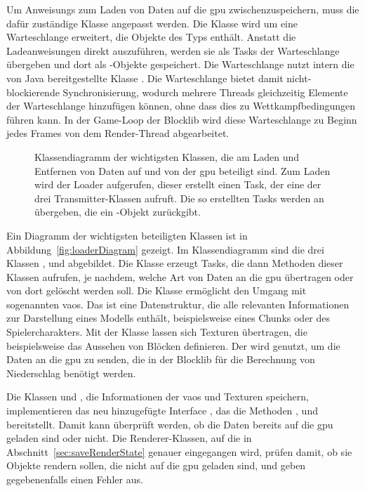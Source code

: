 Um \glspl{Anweisung} zum Laden von Daten auf die \ac{gpu} zwischenzuspeichern, muss die dafür zuständige Klasse \classLoader{} angepasst werden. Die Klasse wird um eine Warteschlange erweitert, die Objekte des Typs \classRunnable{} enthält. Anstatt die Ladeanweisungen direkt auszuführen, werden sie als Tasks der Warteschlange übergeben und dort als \classRunnable{}-Objekte gespeichert. Die Warteschlange nutzt intern die von Java bereitgestellte Klasse \classConcurrentLinkedQueue{}. Die Warteschlange bietet damit nicht-blockierende Synchronisierung, wodurch mehrere Threads gleichzeitig Elemente der Warteschlange hinzufügen können, ohne dass dies zu Wettkampfbedingungen führen kann. In der Game-Loop der Blocklib wird diese Warteschlange zu Beginn jedes Frames von dem Render-Thread abgearbeitet.

\begin{figure}
	\centering
	
	\caption[Klassendiagramm der wichtigsten Klassen, die am Laden und Entfernen von Daten auf und von der  beteiligt sind.]{Klassendiagramm der wichtigsten Klassen, die am Laden und Entfernen von Daten auf und von der \ac{gpu} beteiligt sind. Zum Laden wird der Loader aufgerufen, dieser erstellt einen Task, der eine der drei Transmitter-Klassen aufruft. Die so erstellten Tasks werden an \classDoubleBufferedAsyncQueue{} übergeben, die ein \classCompletableFuture{}-Objekt zurückgibt.}\label{fig:loaderDiagram}
\end{figure}
Ein Diagramm der wichtigsten beteiligten Klassen ist in Abbildung~\vref{fig:loaderDiagram} gezeigt. Im Klassendiagramm sind die drei Klassen \classVAOTransmitter{}, \classTextureTransmitter{} und \classDataTransmitter{} abgebildet. Die Klasse \classLoader{} erzeugt Tasks, die dann Methoden dieser Klassen aufrufen, je nachdem, welche Art von Daten an die \ac{gpu} übertragen oder von dort gelöscht werden soll. Die Klasse \classVAOTransmitter{} ermöglicht den Umgang mit sogenannten \acp{vao}. Das ist eine Datenstruktur, die alle relevanten Informationen zur Darstellung eines Modells enthält, beispielsweise eines Chunks oder des Spielercharakters. Mit der Klasse \classTextureTransmitter{} lassen sich Texturen übertragen, die beispielsweise das Aussehen von Blöcken definieren. Der \classDataTransmitter{} wird genutzt, um die Daten an die \ac{gpu} zu senden, die in der Blocklib für die Berechnung von Niederschlag benötigt werden.

Die Klassen \classRawModel{} und \classModelTexture{}, die Informationen der \acp{vao} und Texturen speichern, implementieren das neu hinzugefügte Interface \classAsyncGraphicsObject{}, das die Methoden 	, 
 und 
 bereitstellt. Damit kann überprüft werden, ob die Daten bereits auf die \ac{gpu} geladen sind oder nicht. Die Renderer-Klassen, auf die in Abschnitt~\ref{sec:saveRenderState} genauer eingegangen wird, prüfen damit, ob sie Objekte rendern sollen, die nicht auf die \ac{gpu} geladen sind, und geben gegebenenfalls einen Fehler aus.

